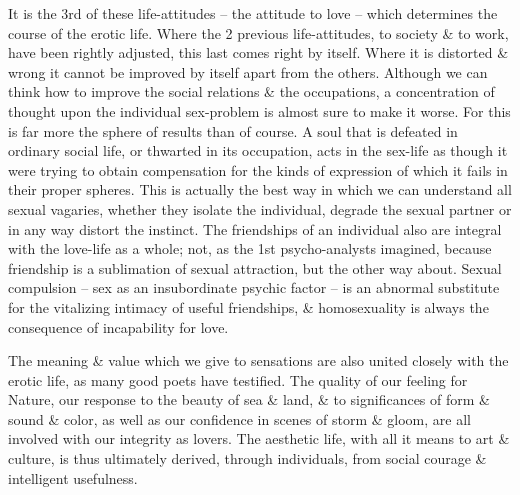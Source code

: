\documentclass{article}
\numberwithin{equation}{section}
\begin{document}
It is the 3rd of these life-attitudes -- the attitude to love -- which determines the course of the erotic life. Where the 2 previous life-attitudes, to society \& to work, have been rightly adjusted, this last comes right by itself. Where it is distorted \& wrong it cannot be improved by itself apart from the others. Although we can think how to improve the social relations \& the occupations, a concentration of thought upon the individual sex-problem is almost sure to make it worse. For this is far more the sphere of results than of course. A soul that is defeated in ordinary social life, or thwarted in its occupation, acts in the sex-life as though it were trying to obtain compensation for the kinds of expression of which it fails in their proper spheres. This is actually the best way in which we can understand all sexual vagaries, whether they isolate the individual, degrade the sexual partner or in any way distort the instinct. The friendships of an individual also are integral with the love-life as a whole; not, as the 1st psycho-analysts imagined, because friendship is a sublimation of sexual attraction, but the other way about. Sexual compulsion -- sex as an insubordinate psychic factor -- is an abnormal substitute for the vitalizing intimacy of useful friendships, \& homosexuality is always the consequence of incapability for love.

The meaning \& value which we give to sensations are also united closely with the erotic life, as many good poets have testified. The quality of our feeling for Nature, our response to the beauty of sea \& land, \& to significances of form \& sound \& color, as well as our confidence in scenes of storm \& gloom, are all involved with our integrity as lovers. The aesthetic life, with all it means to art \& culture, is thus ultimately derived, through individuals, from social courage \& intelligent usefulness.
\end{document}

